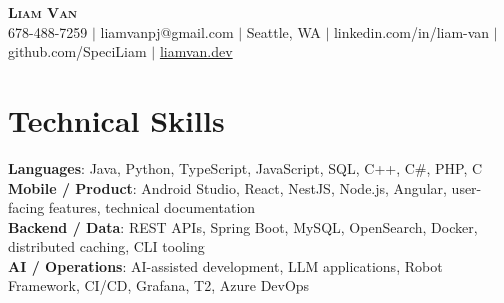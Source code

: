 \documentclass[letterpaper,11pt]{article}
\begin{document}

%
\begin{center}
    \textbf{\Huge \scshape Liam Van} \\ \vspace{1pt}
    \small 678-488-7259 $|$ \small {liamvanpj@gmail.com} $|$ Seattle, WA
 {{$|$ linkedin.com/in/liam-van} {$|$ github.com/SpeciLiam} {$|$ \href{https://liamvan.dev}{liamvan.dev}}}

\end{center}

\section{Technical Skills}
 \begin{itemize}[leftmargin=0.15in, label={}]
    \small{\item{
     \textbf{Languages}{: Java, Python, TypeScript, JavaScript, SQL, C++, C\#, PHP, C} \\
     \textbf{Mobile / Product}{: Android Studio, React, NestJS, Node.js, Angular, user-facing features, technical documentation} \\
     \textbf{Backend / Data}{: REST APIs, Spring Boot, MySQL, OpenSearch, Docker, distributed caching, CLI tooling} \\
     \textbf{AI / Operations}{: AI-assisted development, LLM applications, Robot Framework, CI/CD, Grafana, T2, Azure DevOps} \\
    }}
 \end{itemize}
%

\end{document}
